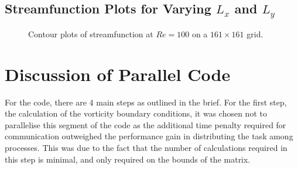 \documentclass[11pt]{article}
\begin{document}
	
	\subsection{Streamfunction Plots for Varying $L_x$ and $L_y$}
	\begin{figure}[htp]
            \centering
            \hfill
            \caption{Contour plots of  streamfunction at $Re=100$ on a $161 \times 161$ grid.}
            \label{fig:contours}
        \end{figure}	
	
	
%	
		
	\section{Discussion of Parallel Code}
	For the code, there are 4 main steps as outlined in the brief. For the first step, the calculation of the vorticity boundary conditions, it was chosen not to parallelise this segment of the code as the additional time penalty required for communication outweighed the performance gain in distributing the task among processes. This was due to the fact that the number of calculations required in this step is minimal, and only required on the bounds of the matrix.\\
	
\end{document}
